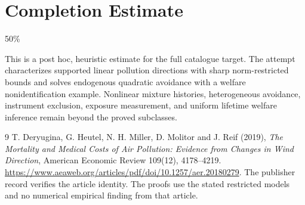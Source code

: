 \documentclass[11pt,a4paper]{article}
\begin{document}
\section{Completion Estimate}
50\%

This is a post hoc, heuristic estimate for the full catalogue target.
The attempt characterizes supported linear pollution directions with sharp norm-restricted bounds and solves endogenous quadratic avoidance with a welfare nonidentification example. Nonlinear mixture histories, heterogeneous avoidance, instrument exclusion, exposure measurement, and uniform lifetime welfare inference remain beyond the proved subclasses.

\begin{thebibliography}{9}
 T. Deryugina, G. Heutel, N. H. Miller, D. Molitor and J. Reif (2019), \emph{The Mortality and Medical Costs of Air Pollution: Evidence from Changes in Wind Direction}, American Economic Review 109(12), 4178--4219. \url{https://www.aeaweb.org/articles/pdf/doi/10.1257/aer.20180279}. The publisher record verifies the article identity. The proofs use the stated restricted models and no numerical empirical finding from that article.
\end{thebibliography}
\end{document}
